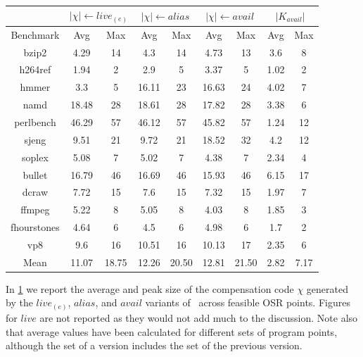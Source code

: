 \begin{table}[!ht]
\begin{center}
\begin{small}
\begin{tabular}{ |c|c|c|c|c|c|c|c|c| }
\cline{2-9}
\multicolumn{1}{l|}{} & \multicolumn{2}{c|}{$|\chi|\leftarrow live_{(e)}$} & \multicolumn{2}{c|}{$|\chi|\leftarrow alias$} & \multicolumn{2}{c|}{$|\chi|\leftarrow avail$} & \multicolumn{2}{c|}{$|K_{avail}|$} \\
\hline
Benchmark & Avg & Max & Avg & Max & Avg & Max & Avg & Max \\
\hline
\hline
bzip2 & 4.29 & 14 & 4.3 & 14 & 4.73 & 13 & 3.6 & 8 \\
\hline
h264ref & 1.94 & 2 & 2.9 & 5 & 3.37 & 5 & 1.02 & 2 \\
\hline
hmmer & 3.3 & 5 & 16.11 & 23 & 16.63 & 24 & 4.02 & 7 \\
\hline
namd & 18.48 & 28 & 18.61 & 28 & 17.82 & 28 & 3.38 & 6 \\
\hline
perlbench & 46.29 & 57 & 46.12 & 57 & 45.82 & 57 & 1.24 & 12 \\
\hline
sjeng & 9.51 & 21 & 9.72 & 21 & 18.52 & 32 & 4.2 & 12 \\
\hline
soplex & 5.08 & 7 & 5.02 & 7 & 4.38 & 7 & 2.34 & 4 \\
\hline
bullet & 16.79 & 46 & 16.69 & 46 & 15.93 & 46 & 6.15 & 17 \\
\hline
dcraw & 7.72 & 15 & 7.6 & 15 & 7.32 & 15 & 1.97 & 7 \\
\hline
ffmpeg & 5.22 & 8 & 5.05 & 8 & 4.03 & 8 & 1.85 & 3 \\
\hline
fhourstones & 4.64 & 6 & 4.5 & 6 & 4.98 & 6 & 1.7 & 2 \\
\hline
vp8 & 9.6 & 16 & 10.51 & 16 & 10.13 & 17 & 2.35 & 6 \\
\hline
\hline
Mean & 11.07 & 18.75 & 12.26 & 20.50 & 12.81 & 21.50 & 2.82 & 7.17 \\
\hline
\end{tabular} 
\end{small}
\end{center}
\caption{\label{tab:OSR-alC-prologue-BtoO} \missing} 
\end{table}

In \mytable\ref{tab:OSR-alC-prologue-BtoO} we report the average and peak size of the compensation code $\chi$ generated by the $live_{(e)}$, $alias$, and $avail$ variants of \reconstruct\ across feasible OSR points. Figures for $live$ are not reported as they would not add much to the discussion. Note also that average values have been calculated for different sets of program points, although the set of a version includes the set of the previous version.

